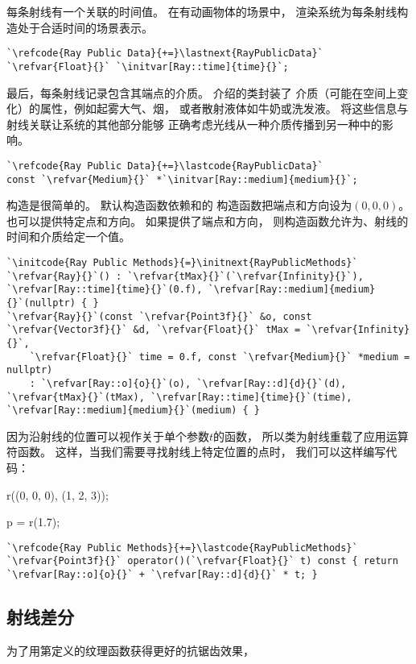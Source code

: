 每条射线有一个关联的时间值。
在有动画物体的场景中，
渲染系统为每条射线构造处于合适时间的场景表示。
\begin{lstlisting}
`\refcode{Ray Public Data}{+=}\lastnext{RayPublicData}`
`\refvar{Float}{}` `\initvar[Ray::time]{time}{}`;
\end{lstlisting}

最后，每条射线记录包含其端点的介质。
介绍的类封装了
介质（可能在空间上变化）的属性，例如起雾大气、烟，
或者散射液体如牛奶或洗发液。
将这些信息与射线关联让系统的其他部分能够
正确考虑光线从一种介质传播到另一种中的影响。
\begin{lstlisting}
`\refcode{Ray Public Data}{+=}\lastcode{RayPublicData}`
const `\refvar{Medium}{}` *`\initvar[Ray::medium]{medium}{}`;
\end{lstlisting}

构造是很简单的。
默认构造函数依赖和的
构造函数把端点和方向设为$(0,0,0)$。
也可以提供特定点和方向。
如果提供了端点和方向，
则构造函数允许为、射线的时间和介质给定一个值。
\begin{lstlisting}
`\initcode{Ray Public Methods}{=}\initnext{RayPublicMethods}`
`\refvar{Ray}{}`() : `\refvar{tMax}{}`(`\refvar{Infinity}{}`), `\refvar[Ray::time]{time}{}`(0.f), `\refvar[Ray::medium]{medium}{}`(nullptr) { }
`\refvar{Ray}{}`(const `\refvar{Point3f}{}` &o, const `\refvar{Vector3f}{}` &d, `\refvar{Float}{}` tMax = `\refvar{Infinity}{}`,
    `\refvar{Float}{}` time = 0.f, const `\refvar{Medium}{}` *medium = nullptr)
    : `\refvar[Ray::o]{o}{}`(o), `\refvar[Ray::d]{d}{}`(d), `\refvar{tMax}{}`(tMax), `\refvar[Ray::time]{time}{}`(time), `\refvar[Ray::medium]{medium}{}`(medium) { }
\end{lstlisting}

因为沿射线的位置可以视作关于单个参数$t$的函数，
所以类为射线重载了应用运算符函数。
这样，当我们需要寻找射线上特定位置的点时，
我们可以这样编写代码：

{\ttfamily\indent\indent{} r((0, 0, 0), (1, 2, 3));}

{\ttfamily\indent\indent{} p = r(1.7);}

\begin{lstlisting}
`\refcode{Ray Public Methods}{+=}\lastcode{RayPublicMethods}`
`\refvar{Point3f}{}` operator()(`\refvar{Float}{}` t) const { return `\refvar[Ray::o]{o}{}` + `\refvar[Ray::d]{d}{}` * t; }
\end{lstlisting}

\subsection{射线差分}\label{sub:射线差分}
为了用第定义的纹理函数获得更好的抗锯齿效果，